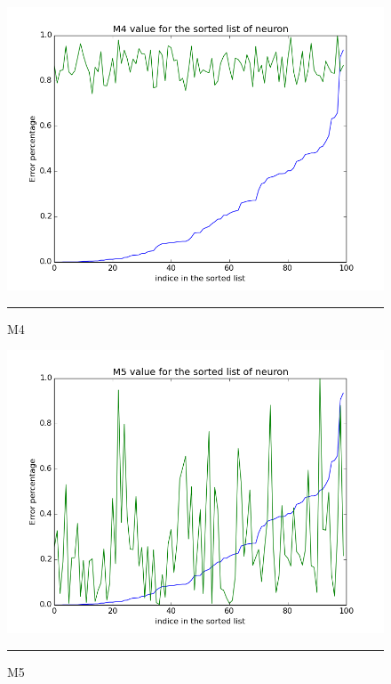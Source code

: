 \begin{figure}[!htb]
    \centering
    \includegraphics[scale=0.5]{Figures/m4.png}
    \rule{35em}{0.5pt}
    \caption[M4]{M4}
    \label{fig:m4}
\end{figure}


\begin{figure}[!htb]
    \centering
    \includegraphics[scale=0.5]{Figures/m5.png}
    \rule{35em}{0.5pt}
    \caption[M5]{M5}
    \label{fig:m5}
\end{figure}


